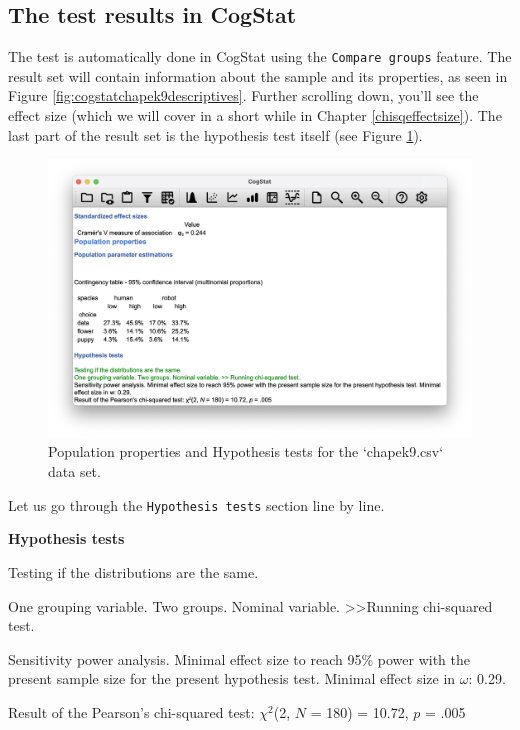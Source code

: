 \documentclass[
  11pt,
  a4paper,
  twoside,symmetric,openright]{book}
\theoremstyle{break}
\theoremstyle{break}
\begin{document}
\subsection{The test results in CogStat}\label{AssocTestInCogStat}

The test is automatically done in CogStat using the \texttt{Compare\ groups} feature. The result set will contain information about the sample and its properties, as seen in Figure \ref{fig:cogstatchapek9descriptives}. Further scrolling down, you'll see the effect size (which we will cover in a short while in Chapter \ref{chisqeffectsize}). The last part of the result set is the hypothesis test itself (see Figure \ref{fig:cogstatchapek9hypo}).

\begin{figure}

{\centering \includegraphics[width=0.6\linewidth]{resources/image/cogstatchapek9hypo} 

}

\caption{Population properties and Hypothesis tests for the `chapek9.csv` data set.}\label{fig:cogstatchapek9hypo}
\end{figure}

Let us go through the \texttt{Hypothesis\ tests} section line by line.

\begin{tcolorbox}[colback=white,
  colframe=lightgray,
  coltext=black,
  boxsep=4pt,
  boxrule=0.3pt,
  arc=0pt]
  {   \sffamily
      \color{CSblue}\textbf{Hypothesis tests}
      
      \color{CSgreen}Testing if the distributions are the same.
      
      One grouping variable. Two groups. Nominal variable. \textgreater\textgreater  Running chi-squared test.
      
      \color{black}
      Sensitivity power analysis. Minimal effect size to reach 95\% power with the present sample size for the present hypothesis test. Minimal effect size in $\omega$: 0.29.
      
      Result of the Pearson's chi-squared test: $\chi^2$(2, $N$ = 180) = 10.72, $p$ = .005
      \normalfont
  }
\end{tcolorbox}
\end{document}
